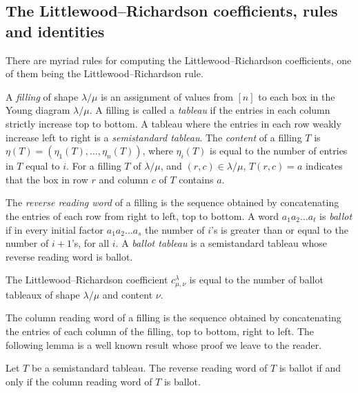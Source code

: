 \subsection{The Littlewood--Richardson coefficients, rules and identities}\label{subsec:LRrule}

There are myriad rules for computing the Littlewood--Richardson coefficients, one of them being the Littlewood--Richardson rule.

A \emph{filling} of shape $\lambda / \mu$ is an assignment of values from $[n]$ to each box in the Young diagram $\lambda / \mu$. A filling is called a \emph{tableau} if the entries in each column strictly increase top to bottom. A tableau where the entries in each row weakly increase left to right is a \emph{semistandard tableau}. The \emph{content} of a filling $T$ is $\eta(T) = (\eta_1(T), \ldots, \eta_n(T))$, where $\eta_i(T)$ is equal to the number of entries in $T$ equal to $i$. For a filling $T$ of $\lambda / \mu$, and $(r,c) \in \lambda / \mu$, $T(r,c)=a$ indicates that the box in row $r$ and column $c$ of $T$ contains $a$.

The \emph{reverse reading word} of a filling is the sequence obtained by concatenating the entries of each row from right to left, top to bottom. A word $a_1 a_2 \ldots a_t$ is \emph{ballot} if in every initial factor $a_1 a_2 \ldots a_s$ the number of $i$'s is greater than or equal to the number of $i+1$'s, for all $i$. A \emph{ballot tableau} is a semistandard tableau whose reverse reading word is ballot.

\begin{theorem} 
\label{theorem:lrrule}
The Littlewood--Richardson coefficient $c_{\mu, \nu}^{\lambda}$ is equal to the number of ballot tableaux of shape $\lambda / \mu$ and content $\nu$.
\end{theorem}

The column reading word of a filling is the sequence obtained by concatenating the entries of each column of the filling, top to bottom, right to left. The following lemma is a well known result whose proof we leave to the reader.

\begin{lemma}[\cite{FG93}]
\label{lemma:readingwordequiv}
Let $T$ be a semistandard tableau. The reverse reading word of $T$ is ballot if and only if the column reading word of $T$ is ballot.
\end{lemma}

